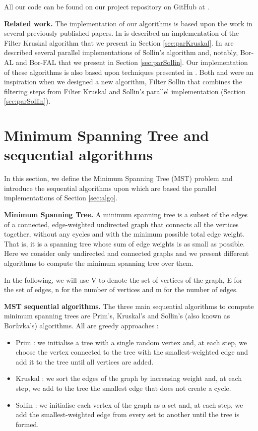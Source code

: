\documentclass[letterpaper]{article}
\newcommand{\mypar}[1]{{\bf #1.}}
\begin{document}
All our code can be found on our project repository on GitHub at \cite{code}.

\mypar{Related work} The implementation of our algorithms is based upon the work in several previously published papers.
In \cite{kruskal} is described an implementation of the Filter Kruskal algorithm that we present in Section \ref{sec:parKruskal}.
In \cite{sollin} are described several parallel implementations of Sollin's algorithm and, notably, Bor-AL and Bor-FAL that we present in Section \ref{sec:parSollin}. Our implementation of these algorithms is also based upon techniques presented in \cite{pointerJump}. Both \cite{kruskal} and \cite{sollin} were an inspiration when we designed a new algorithm, Filter Sollin that combines the filtering steps from Filter Kruskal and Sollin's parallel implementation (Section \ref{sec:parSollin}).


\section{Minimum Spanning Tree and sequential algorithms}\label{sec:background}

In this section, we define the Minimum Spanning Tree (MST) problem and introduce the sequential algorithms upon which are based the parallel implementations of Section \ref{sec:algo}.

\mypar{Minimum Spanning Tree}
A minimum spanning tree is a subset of the edges of a connected, edge-weighted undirected graph that connects all the vertices together, without any cycles and with the minimum possible total edge weight.
That is, it is a spanning tree whose sum of edge weights is as small as possible. 
Here we consider only undirected and connected graphs and we present different algorithms to compute the minimum spanning tree over them. 

In the following, we will use V to denote the set of vertices of the graph, E for the set of edges, n for the number of vertices and m for the number of edges.

\mypar{MST sequential algorithms} The three main sequential algorithms to compute minimum spanning trees are Prim's, Kruskal's and Sollin's (also known as Bor\r{u}vka's)  algorithms. All are greedy approaches :
\begin{itemize}
    \item Prim : we initialise a tree with a single random vertex and, at each step, we choose the vertex connected to the tree with the smallest-weighted edge and add it to the tree until all vertices are added.
    \item Kruskal : we sort the edges of the graph by increasing weight and, at each step, we add to the tree the smallest edge that does not create a cycle.
    \item Sollin : we initialise each vertex of the graph as a set and, at each step, we add the smallest-weighted edge from every set to another until the tree is formed.
\end{itemize}
\end{document}
